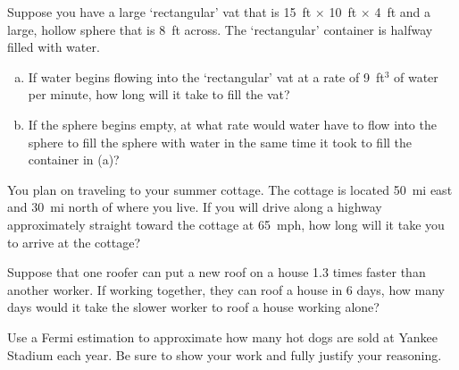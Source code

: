 \documentclass[11pt,letterpaper]{article}
\begin{document}

 Suppose you have a large `rectangular' vat that is 15~ft $\times$ 10~ft $\times$ 4~ft and a large, hollow sphere that is 8~ft across. The `rectangular' container is halfway filled with water. 
	\begin{enumerate}[(a)]
	\item If water begins flowing into the `rectangular' vat at a rate of 9~ft$^3$ of water per minute, how long will it take to fill the vat?
	\item If the sphere begins empty, at what rate would water have to flow into the sphere to fill the sphere with water in the same time it took to fill the container in (a)?
	\end{enumerate}



\newpage



 You plan on traveling to your summer cottage. The cottage is located 50~mi east and 30~mi north of where you live. If you will drive along a highway approximately straight toward the cottage at 65~mph, how long will it take you to arrive at the cottage?



\newpage



 Suppose that one roofer can put a new roof on a house 1.3 times faster than another worker. If working together, they can roof a house in 6 days, how many days would it take the slower worker to roof a house working alone?



\newpage



 Use a Fermi estimation to approximate how many hot dogs are sold at Yankee Stadium each year. Be sure to show your work and fully justify your reasoning. 
\end{document}
